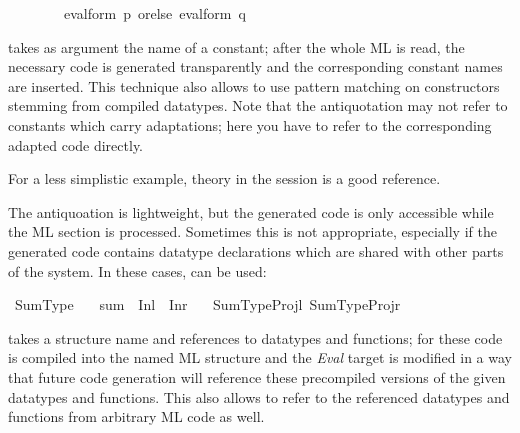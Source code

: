 \begin{isabellebody}
\ \ \ \ \ \ \ \ eval{}form\ p\ orelse\ eval{}form\ q{}\isanewline
{}%
\endisatagquotett
{\isafoldquotett}%
%
\isadelimquotett
%
\endisadelimquotett
%
\begin{isamarkuptext}%
\noindent {} takes as argument the name of a constant;
  after the whole ML is read, the necessary code is generated
  transparently and the corresponding constant names are inserted.
  This technique also allows to use pattern matching on constructors
  stemming from compiled datatypes.  Note that the 
  antiquotation may not refer to constants which carry adaptations;
  here you have to refer to the corresponding adapted code directly.

  For a less simplistic example, theory  in
  the  session is a good reference.%
\end{isamarkuptext}%
\isamarkuptrue%
%
\isamarkuptrue%
%
\begin{isamarkuptext}%
The  antiquoation is lightweight, but the generated code
  is only accessible while the ML section is processed.  Sometimes this
  is not appropriate, especially if the generated code contains datatype
  declarations which are shared with other parts of the system.  In these
  cases, \hypertarget{command.code-reflect}{\hyperlink{command.code-reflect}{\mbox{}}} can be used:%
\end{isamarkuptext}%
\isamarkuptrue%
%
\isadelimquote
%
\endisadelimquote
%
\isatagquote
{}\isamarkupfalse%
\ Sum{}Type\isanewline
\ \ \ sum\ {}\ Inl\ {}\ Inr\isanewline
\ \ \ {}Sum{}Type{}Projl{}\ {}Sum{}Type{}Projr{}%
\endisatagquote
{\isafoldquote}%
%
\isadelimquote
%
\endisadelimquote
%
\begin{isamarkuptext}%
\noindent {}\hypertarget{command.code-reflect}{\hyperlink{command.code-reflect}{\mbox{}}} takes a structure name and
  references to datatypes and functions; for these code is compiled
  into the named ML structure and the \emph{Eval} target is modified
  in a way that future code generation will reference these
  precompiled versions of the given datatypes and functions.  This
  also allows to refer to the referenced datatypes and functions from
  arbitrary ML code as well.


\end{isamarkuptext}
\end{isabellebody}
